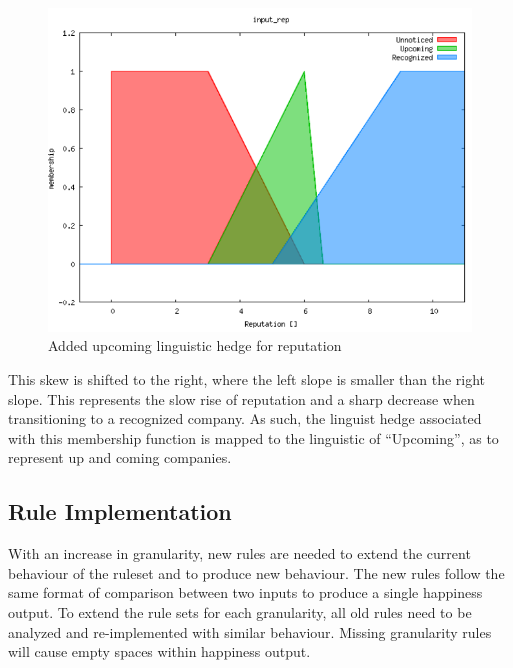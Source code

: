 \documentclass[12pt,fleqn,reqno,letterpaper]{article}
\begin{document}
\begin{figure}[H]
  \centering
  \includegraphics[scale=0.5,natwidth=656,natheight=501]{fig/upcoming_skew.png}
  \caption{Added upcoming linguistic hedge for reputation}
  \label{fig:UPCOMING-SKEW}
\end{figure}

This skew is shifted to the right, where the left slope is smaller than the right slope.  This represents the slow rise of reputation and a sharp decrease when transitioning to a recognized company.  As such, the linguist hedge associated with this membership function is mapped to the linguistic of “Upcoming”, as to represent up and coming companies.

\subsection{Rule Implementation}
With an increase in granularity, new rules are needed to extend the current behaviour of the ruleset and to produce new behaviour.  The new rules follow the same format of comparison between two inputs to produce a single happiness output.  To extend the rule sets for each granularity, all old rules need to be analyzed and re-implemented with similar behaviour.  Missing granularity rules will cause empty spaces within happiness output.
\end{document}
